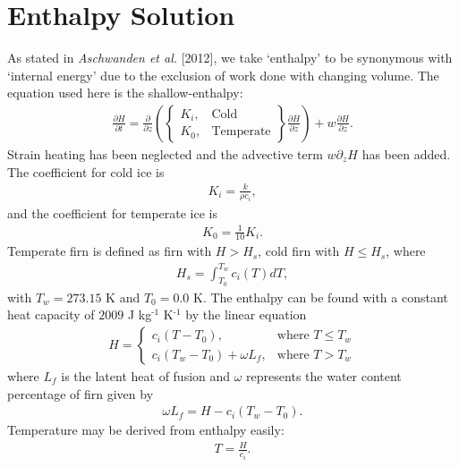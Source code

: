 \documentclass{article}%
\newcommand{\sups}[1]{\ensuremath{^{\textrm{#1}}}}
\begin{document}
\section{Enthalpy Solution}

As stated in \emph{Aschwanden et al.} [2012], we take `enthalpy' to be synonymous with `internal energy' due to the exclusion of work done with changing volume.  The equation used here is the shallow-enthalpy:
\begin{align}
  \frac{\partial H}{\partial t} = \frac{\partial}{\partial z} 
    \left( 
      \begin{Bmatrix}
        K_i, &\text{Cold}\\
        K_0, &\text{Temperate}
      \end{Bmatrix}
      \frac{\partial H}{\partial z} 
    \right) + w \frac{\partial H}{\partial z}.
\end{align}
Strain heating has been neglected and the advective term $w \partial_z H$ has been added.  The coefficient for cold ice is 
\begin{align*}
  K_i = \frac{k}{\rho c_i},
\end{align*}
and the coefficient for temperate ice is
\begin{align*}
  K_0 = \frac{1}{10}K_i.
\end{align*}
Temperate firn is defined as firn with $H > H_s$, cold firn with $H \leq H_s$, where
\begin{align*}
  H_s = \int_{T_0}^{T_w}{c_i(T)}dT,
\end{align*}
with $T_w = 273.15$ K and $T_0 = 0.0$ K.  The enthalpy can be found with a constant heat capacity of $2009$ J kg\sups{-1} K\sups{-1} by the linear equation
\begin{align}
  H = 
  \begin{cases}
    c_i(T - T_0), &\text{where } T \leq T_w\\
    c_i(T_w - T_0) + \omega L_f,  &\text{where } T > T_w
  \end{cases}
\end{align}
where $L_f$ is the latent heat of fusion and $\omega$ represents the water content percentage of firn given by
\begin{align}
  \omega L_f = H - c_i(T_w - T_0).
\end{align}
Temperature may be derived from enthalpy easily:
\begin{align}
  T = \frac{H}{c_i}.
\end{align}
\end{document}
